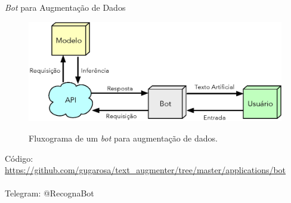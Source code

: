 \begin{frame}{\emph{Bot} para Augmentação de Dados}
	\begin{figure}[!ht]
		\centering
		\includegraphics[scale=0.45]{figs/bot.eps}	
		\label{f.bot}
		\caption{Fluxograma de um \emph{bot} para augmentação de dados.}
	\end{figure}
	Código: \url{https://github.com/gugarosa/text_augmenter/tree/master/applications/bot}
	\\~\\
	Telegram: @RecognaBot
\end{frame}

